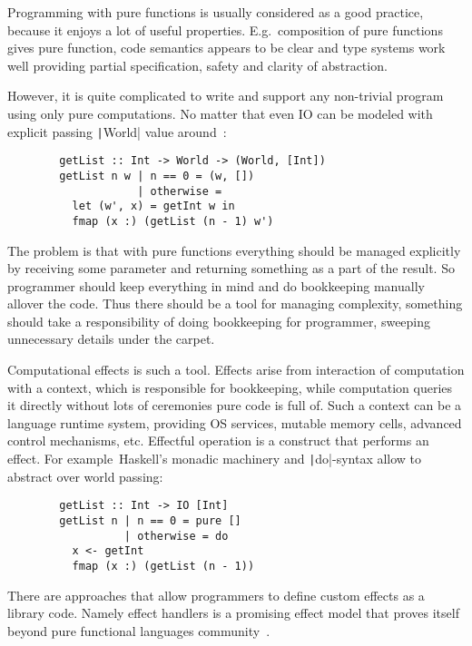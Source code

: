 \documentclass[conference]{IEEEtran}
\begin{document}
    Programming with pure functions is usually considered as a good practice, because it enjoys a lot of useful properties.
    E.g.\ composition of pure functions gives pure function, code semantics appears to be clear and type systems work well providing partial specification, safety and clarity of abstraction.

    However, it is quite complicated to write and support any non-trivial program using only pure computations.
    No matter that even IO can be modeled with explicit passing \texttt|World| value around~\cite{io}:

    \begin{verbatim}
        getList :: Int -> World -> (World, [Int])
        getList n w | n == 0 = (w, [])
                    | otherwise =
          let (w', x) = getInt w in
          fmap (x :) (getList (n - 1) w')
    \end{verbatim}

    The problem is that with pure functions everything should be managed explicitly by receiving some parameter and returning something as a part of the result.
    So programmer should keep everything in mind and do bookkeeping manually allover the code.
    Thus there should be a tool for managing complexity, something should take a responsibility of doing bookkeeping for programmer, sweeping unnecessary details under the carpet.

    Computational effects is such a tool.
    Effects arise from interaction of computation with a context, which is responsible for bookkeeping, while computation queries it directly without lots of ceremonies pure code is full of.
    Such a context can be a language runtime system, providing OS services, mutable memory cells, advanced control mechanisms, etc.
    Effectful operation is a construct that performs an effect.
    For example\ Haskell's monadic machinery and \texttt|do|-syntax allow to abstract over world passing:

    \begin{verbatim}
        getList :: Int -> IO [Int]
        getList n | n == 0 = pure []
                  | otherwise = do
          x <- getInt
          fmap (x :) (getList (n - 1))
    \end{verbatim}

    There are approaches that allow programmers to define custom effects as a library code.
    Namely effect handlers is a promising effect model that proves itself beyond pure functional languages community~\cite{eh-mainstream}.
\end{document}
